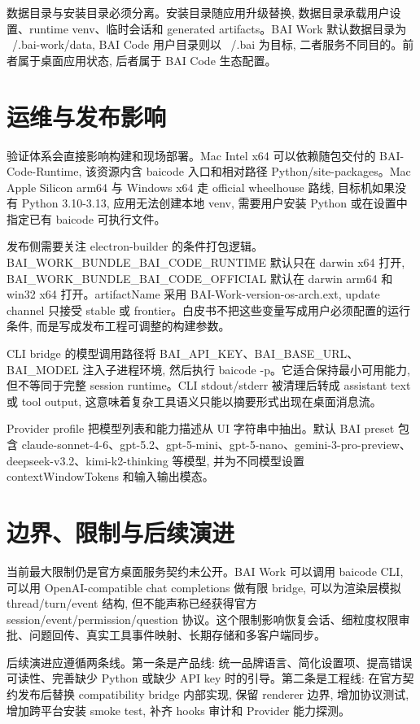 数据目录与安装目录必须分离。安装目录随应用升级替换, 数据目录承载用户设置、runtime venv、临时会话和 generated artifacts。BAI Work 默认数据目录为 ~/.bai-work/data, BAI Code 用户目录则以 ~/.bai 为目标, 二者服务不同目的。前者属于桌面应用状态, 后者属于 BAI Code 生态配置。

\section{运维与发布影响}
验证体系会直接影响构建和现场部署。Mac Intel x64 可以依赖随包交付的 BAI-Code-Runtime, 该资源内含 baicode 入口和相对路径 Python/site-packages。Mac Apple Silicon arm64 与 Windows x64 走 official wheelhouse 路线, 目标机如果没有 Python 3.10-3.13, 应用无法创建本地 venv, 需要用户安装 Python 或在设置中指定已有 baicode 可执行文件。

发布侧需要关注 electron-builder 的条件打包逻辑。BAI\_WORK\_BUNDLE\_BAI\_CODE\_RUNTIME 默认只在 darwin x64 打开, BAI\_WORK\_BUNDLE\_BAI\_CODE\_OFFICIAL 默认在 darwin arm64 和 win32 x64 打开。artifactName 采用 BAI-Work-{version}-{os}-{arch}.{ext}, update channel 只接受 stable 或 frontier。白皮书不把这些变量写成用户必须配置的运行条件, 而是写成发布工程可调整的构建参数。

CLI bridge 的模型调用路径将 BAI\_API\_KEY、BAI\_BASE\_URL、BAI\_MODEL 注入子进程环境, 然后执行 baicode -p。它适合保持最小可用能力, 但不等同于完整 session runtime。CLI stdout/stderr 被清理后转成 assistant text 或 tool output, 这意味着复杂工具语义只能以摘要形式出现在桌面消息流。

Provider profile 把模型列表和能力描述从 UI 字符串中抽出。默认 BAI preset 包含 claude-sonnet-4-6、gpt-5.2、gpt-5-mini、gpt-5-nano、gemini-3-pro-preview、deepseek-v3.2、kimi-k2-thinking 等模型, 并为不同模型设置 contextWindowTokens 和输入输出模态。

\section{边界、限制与后续演进}
当前最大限制仍是官方桌面服务契约未公开。BAI Work 可以调用 baicode CLI, 可以用 OpenAI-compatible chat completions 做有限 bridge, 可以为渲染层模拟 thread/turn/event 结构, 但不能声称已经获得官方 session/event/permission/question 协议。这个限制影响恢复会话、细粒度权限审批、问题回传、真实工具事件映射、长期存储和多客户端同步。

后续演进应遵循两条线。第一条是产品线: 统一品牌语言、简化设置项、提高错误可读性、完善缺少 Python 或缺少 API key 时的引导。第二条是工程线: 在官方契约发布后替换 compatibility bridge 内部实现, 保留 renderer 边界, 增加协议测试, 增加跨平台安装 smoke test, 补齐 hooks 审计和 Provider 能力探测。

